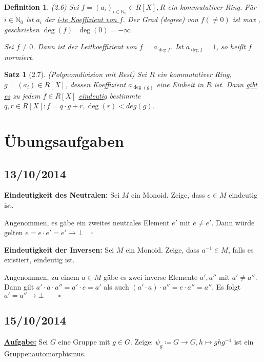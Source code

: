 \documentclass[10pt,a4paper]{article}
\newtheorem{defi}{Definition}
\newtheorem{satz}{Satz}
\begin{document}
\begin{defi}(2.6)
Sei $f = (a_i)_{i \in \mathbb{N}_0} \in R[X], R$ ein kommutativer Ring. Für $i \in \mathbb{N}_0$ ist $a_i$ der \underline{i-te Koeffizient von $f$}. Der \emph{Grad} (\glqq degree\grqq) von $f (\neq 0)$ ist max , geschrieben $\deg (f)$. $\deg(0) = - \infty$.

Sei $f \neq 0$. Dann ist der Leitkoeffizient von $f$ = $a_{\deg f}$. Ist $a_{\deg f} = 1$, so heißt $f$ \emph{normiert}.  
\end{defi}

\begin{satz}[2.7] (Polynomdivision mit Rest)
Sei $R$ ein kommutativer Ring, $g = (a_i) \in R[X]$, dessen Koeffizient $a_{\deg(g)}$ eine Einheit in $R$ ist. Dann \underline{gibt es} zu jedem $f \in R[X]$ \underline{eindeutig} bestimmte $q, r \in R[X]: f = q \cdot g + r, \deg(r) < deg(g)$.
\end{satz}


\newpage
\section{Übungsaufgaben}

\subsection{13/10/2014}

\textbf{Eindeutigkeit des Neutralen:} Sei $M$ ein Monoid. Zeige, dass $e \in M$ eindeutig ist.\bigskip

Angenommen, es gäbe ein zweites neutrales Element $e'$ mit $e \neq e'$. Dann würde gelten $e = e \cdot e' = e' \rightarrow \bot \quad \square$\bigskip

\textbf{Eindeutigkeit der Inversen:} Sei $M$ ein Monoid. Zeige, dass $a^{-1} \in M$, falls es existiert, eindeutig ist.\bigskip

Angenommen, zu einem $a \in M$ gäbe es zwei inverse Elemente $a', a''$ mit $a' \neq a''$. Dann gilt $a' \cdot a \cdot a''= a' \cdot e = a'$ als auch $(a' \cdot a) \cdot a'' = e \cdot a'' = a''$. Es folgt $a' = a'' \rightarrow \bot \qquad \square$

\subsection{15/10/2014}

\textbf{\underline{Aufgabe:}} Sei $G$ eine Gruppe mit $g \in G$. Zeige: $\psi_g \coloneqq G \to G, h \mapsto g h g^{-1}$ ist ein Gruppenautomorphismus.
\end{document}

